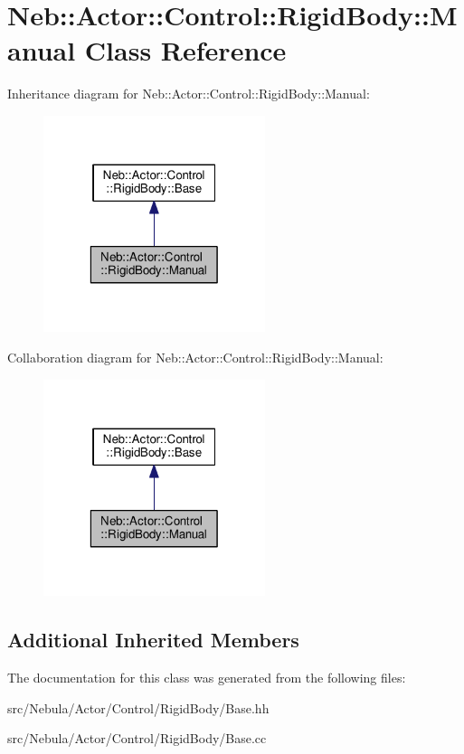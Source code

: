 \hypertarget{classNeb_1_1Actor_1_1Control_1_1RigidBody_1_1Manual}{\section{Neb\-:\-:Actor\-:\-:Control\-:\-:Rigid\-Body\-:\-:Manual Class Reference}
\label{classNeb_1_1Actor_1_1Control_1_1RigidBody_1_1Manual}
}


Inheritance diagram for Neb\-:\-:Actor\-:\-:Control\-:\-:Rigid\-Body\-:\-:Manual\-:
\nopagebreak
\begin{figure}[H]
\begin{center}
\leavevmode
\includegraphics[width=184pt]{classNeb_1_1Actor_1_1Control_1_1RigidBody_1_1Manual__inherit__graph}
\end{center}
\end{figure}


Collaboration diagram for Neb\-:\-:Actor\-:\-:Control\-:\-:Rigid\-Body\-:\-:Manual\-:
\nopagebreak
\begin{figure}[H]
\begin{center}
\leavevmode
\includegraphics[width=184pt]{classNeb_1_1Actor_1_1Control_1_1RigidBody_1_1Manual__coll__graph}
\end{center}
\end{figure}
\subsection*{Additional Inherited Members}


The documentation for this class was generated from the following files\-:\begin{DoxyCompactItemize}
\item 
src/\-Nebula/\-Actor/\-Control/\-Rigid\-Body/Base.\-hh\item 
src/\-Nebula/\-Actor/\-Control/\-Rigid\-Body/Base.\-cc\end{DoxyCompactItemize}
